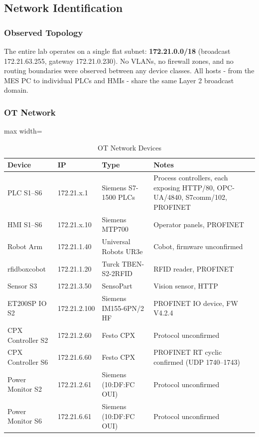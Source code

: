 \subsection{Network Identification}

\subsubsection{Observed Topology}

The entire lab operates on a single flat subnet: \textbf{172.21.0.0/18} (broadcast 172.21.63.255, gateway 172.21.0.230). No VLANs, no firewall zones, and no routing boundaries were observed between any device classes. All hosts - from the MES PC to individual PLCs and HMIs - share the same Layer 2 broadcast domain.

\subsubsection{OT Network}

\begin{table}[H]
\centering
\begin{adjustbox}{max width=\textwidth}
\begin{tabular}{@{}llll@{}}
\toprule
\textbf{Device} & \textbf{IP} & \textbf{Type} & \textbf{Notes} \\
\midrule
PLC S1–S6 & 172.21.x.1 & Siemens S7-1500 PLCs & Process controllers, each exposing HTTP/80, OPC-UA/4840, S7comm/102, PROFINET \\
HMI S1–S6 & 172.21.x.10 & Siemens MTP700 & Operator panels, PROFINET \\
Robot Arm & 172.21.1.40 & Universal Robots UR3e & Cobot, firmware unconfirmed \\
rfidboxcobot & 172.21.1.20 & Turck TBEN-S2-2RFID & RFID reader, PROFINET \\
Sensor S3 & 172.21.3.50 & SensoPart & Vision sensor, HTTP \\
ET200SP IO S2 & 172.21.2.100 & Siemens IM155-6PN/2 HF & PROFINET IO device, FW V4.2.4 \\
CPX Controller S2 & 172.21.2.60 & Festo CPX & Protocol unconfirmed \\
CPX Controller S6 & 172.21.6.60 & Festo CPX & PROFINET RT cyclic confirmed (UDP 1740–1743) \\
Power Monitor S2 & 172.21.2.61 & Siemens (10:DF:FC OUI) & Protocol unconfirmed \\
Power Monitor S6 & 172.21.6.61 & Siemens (10:DF:FC OUI) & Protocol unconfirmed \\
\bottomrule
\end{tabular}
\end{adjustbox}
\caption{OT Network Devices}
\end{table}

